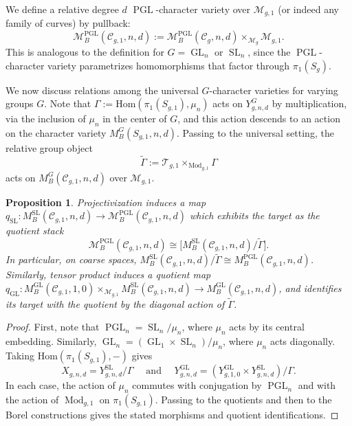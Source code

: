 \documentclass[11pt,reqno]{amsart}
\theoremstyle{plain} %
\newtheorem{prop}[theorem]{Proposition}
\theoremstyle{definition}
\newcommand{\Hom}{\mathrm{Hom}}
\newcommand{\M}{\mathcal{M}}
\newcommand{\C}{\mathcal{C}}
\newcommand{\mc}{\mathcal}
\DeclareMathOperator{\GL}{GL}
\DeclareMathOperator{\SL}{SL}
\DeclareMathOperator{\PGL}{PGL}
\DeclareMathOperator{\Mod}{Mod}
\begin{document}
We define a relative degree $d$ $\PGL$-character variety over $\M_{g,1}$ (or indeed any family of curves) by pullback:
    \[
    \M_B^{\PGL}(\C_{g,1},n,d) := \M_B^{\PGL}(\C_g,n,d) \times_{\M_g} \M_{g,1}.
    \]
    This is analogous to the definition for $G = \GL_n$ or $\SL_n$, since the $\PGL$-character variety parametrizes homomorphisms that factor through $\pi_1(S_g)$.

We now discuss relations among the universal $G$-character varieties for varying groups $G$. Note that $\Gamma := \Hom(\pi_1(S_{g,1}), \mu_n)$ acts on $Y_{g,n,d}^G$ by multiplication, via the inclusion of $\mu_n$ in the center of $G$, and this action descends to an action on the character variety $M_B^G(S_{g,1},n,d)$. Passing to the universal setting, the relative group object $$ \widetilde\Gamma := \mc T_{g,1}  \times_{\Mod_{g,1}} \Gamma$$ acts on $M_B^G(\C_{g,1},n,d)$ over $\M_{g,1}$. %

\begin{prop} \label{prop: relative B relations}
Projectivization induces a map $q_{\SL}\colon M_B^{\SL}(\C_{g,1},n,d) \to \M_B^{\PGL}(\C_{g,1},n,d)$ 
which exhibits the target as the quotient stack
\[
\M_B^{\PGL}(\C_{g,1},n,d) \cong \big[M_B^{\SL}(\C_{g,1},n,d)/\widetilde\Gamma\big].
\]
In particular, on coarse spaces, $M_B^{\SL}(\C_{g,1},n,d)/\widetilde\Gamma \cong M_B^{\PGL}(\C_{g,1},n,d)$. Similarly, tensor product induces a quotient map $q_{\GL}\colon M_B^{\GL}(\C_{g,1},1,0) \times_{\M_{g,1}} M_B^{\SL}(\C_{g,1},n,d)
\to M_B^{\GL}(\C_{g,1},n,d)$,
and identifies its target with the quotient by the diagonal action of $\widetilde\Gamma$.
\end{prop}

\begin{proof}
    First, note that $\PGL_n = \SL_n/\mu_n$, where $\mu_n$ acts by its central embedding. Similarly,  $\GL_n = (\GL_1 \times \SL_n)/\mu_n$, where $\mu_n$ acts diagonally. Taking $\Hom(\pi_1(S_{g,1}), -)$ gives %
    \begin{equation*} %
        X_{g,n,d} = Y_{g,n,d}^{\SL}/ \Gamma 
    \quad \mbox{ and } \quad 
    Y^{\GL}_{g,n,d} = (Y_{g,1,0}^{\GL} \times Y_{g,n,d}^{\SL})/\Gamma.
    \end{equation*}
    In each case, the action of $\mu_n$ commutes with conjugation by $\PGL_n$ and with the action of $\Mod_{g,1}$ on $\pi_1(S_{g,1})$. Passing to the quotients and then to the Borel constructions gives the stated morphisms and quotient identifications. %
\end{proof}
\end{document}

